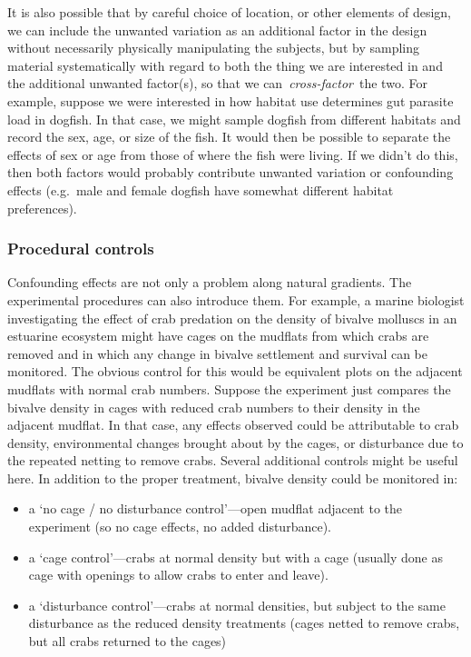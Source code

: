\documentclass[
]{book}
\begin{document}
It is also possible that by careful choice of location, or other elements of design, we can include the unwanted variation as an additional factor in the design without necessarily physically manipulating the subjects, but by sampling material systematically with regard to both the thing we are interested in and the additional unwanted factor(s), so that we can~\emph{cross-factor}~the two. For example, suppose we were interested in how habitat use determines gut parasite load in dogfish. In that case, we might sample dogfish from different habitats and record the sex, age, or size of the fish. It would then be possible to separate the effects of sex or age from those of where the fish were living. If we didn't do this, then both factors would probably contribute unwanted variation or confounding effects (e.g.~male and female dogfish have somewhat different habitat preferences).

\hypertarget{EXPT-DESIGN-PROCEDURAL-CONTROLS}{%
\subsubsection{Procedural controls}\label{EXPT-DESIGN-PROCEDURAL-CONTROLS}}

Confounding effects are not only a problem along natural gradients. The experimental procedures can also introduce them. For example, a marine biologist investigating the effect of crab predation on the density of bivalve molluscs in an estuarine ecosystem might have cages on the mudflats from which crabs are removed and in which any change in bivalve settlement and survival can be monitored. The obvious control for this would be equivalent plots on the adjacent mudflats with normal crab numbers. Suppose the experiment just compares the bivalve density in cages with reduced crab numbers to their density in the adjacent mudflat. In that case, any effects observed could be attributable to crab density, environmental changes brought about by the cages, or disturbance due to the repeated netting to remove crabs. Several additional controls might be useful here. In addition to the proper treatment, bivalve density could be monitored in:

\begin{itemize}
\item
  a `no cage / no disturbance control'---open mudflat adjacent to the experiment (so no cage effects, no added disturbance).
\item
  a `cage control'---crabs at normal density but with a cage (usually done as cage with openings to allow crabs to enter and leave).
\item
  a `disturbance control'---crabs at normal densities, but subject to the same disturbance as the reduced density treatments (cages netted to remove crabs, but all crabs returned to the cages)
\end{itemize}
\end{document}
